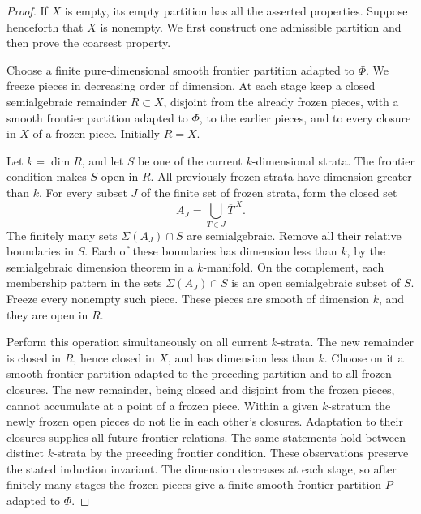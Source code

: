 \begin{proof}
If $X$ is empty, its empty partition has all the asserted properties.
Suppose henceforth that $X$ is nonempty.  We first construct one
admissible partition and then prove the coarsest property.

Choose a finite pure-dimensional smooth frontier partition adapted
to $\Phi$.  We freeze pieces in decreasing order of dimension.  At
each stage keep a closed semialgebraic remainder $R\subset X$,
disjoint from the already frozen pieces, with a smooth frontier
partition adapted to $\Phi$, to the earlier pieces, and to every
closure in $X$ of a frozen piece.  Initially $R=X$.

Let $k=\dim R$, and let $S$ be one of the current $k$-dimensional
strata.  The frontier condition makes $S$ open in $R$.  All previously
frozen strata have dimension greater than $k$.  For every subset $J$
of the finite set of frozen strata, form the closed set
\[
 A_J=\bigcup_{T\in J}\overline T^{\,X}.
\]
The finitely many sets $\Sigma(A_J)\cap S$ are semialgebraic.
Remove all their relative boundaries in $S$.  Each of these
boundaries has dimension less than $k$, by the semialgebraic
dimension theorem in a $k$-manifold.  On the complement, each
membership pattern in the sets $\Sigma(A_J)\cap S$ is an open
semialgebraic subset of $S$.  Freeze every nonempty such piece.
These pieces are smooth of dimension $k$, and they are open in $R$.

Perform this operation simultaneously on all current $k$-strata.
The new remainder is closed in $R$, hence closed in $X$, and has
dimension less than $k$.  Choose on it a smooth frontier partition
adapted to the preceding partition and to all frozen closures.
The new remainder, being closed and disjoint from the frozen pieces,
cannot accumulate at a point of a frozen piece.  Within a given
$k$-stratum the newly frozen open pieces do not lie in each other's
closures.  Adaptation to their closures supplies all future frontier
relations.  The same statements hold between distinct $k$-strata by
the preceding frontier condition.  These observations preserve the
stated induction invariant.  The dimension decreases at each stage,
so after finitely many stages the frozen pieces give a finite smooth
frontier partition $P$ adapted to $\Phi$.


\end{proof}
